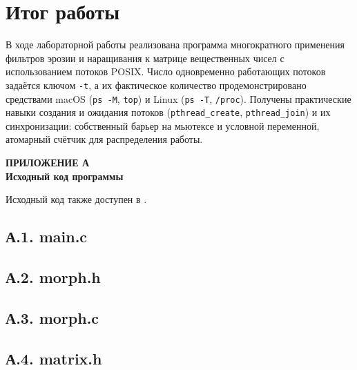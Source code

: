 \documentclass[12pt,a4paper]{article}
\begin{document}
\section{Итог работы}
В ходе лабораторной работы реализована программа многократного применения
фильтров эрозии и наращивания к матрице вещественных чисел с использованием
потоков POSIX. Число одновременно работающих потоков задаётся ключом
\texttt{-t}, а их фактическое количество продемонстрировано средствами macOS
(\texttt{ps -M}, \texttt{top}) и Linux (\texttt{ps -T}, \texttt{/proc}). Получены
практические навыки создания и ожидания потоков (\texttt{pthread\_create},
\texttt{pthread\_join}) и их синхронизации: собственный барьер на мьютексе и
условной переменной, атомарный счётчик для распределения работы.

\newpage
{}
{}
\begin{center}
    {\large\bfseries ПРИЛОЖЕНИЕ А}\\[0.2cm]
    {\bfseries Исходный код программы}
\end{center}

Исходный код также доступен в
.

{}
\subsection*{А.1. main.c}


{}
\subsection*{А.2. morph.h}


{}
\subsection*{А.3. morph.c}


{}
\subsection*{А.4. matrix.h}

\end{document}
